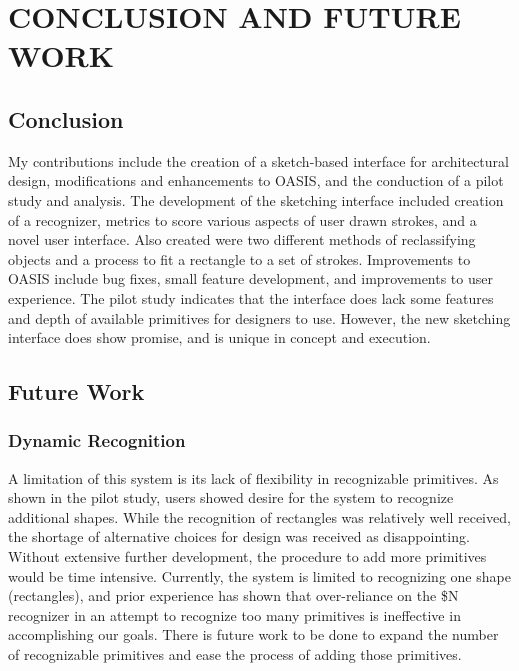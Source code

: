 \chapter{CONCLUSION AND FUTURE WORK} \label{sec:conclusion}

\section{Conclusion}

My contributions include the creation of a sketch-based interface for architectural design, modifications and enhancements to OASIS, and the conduction of a pilot study and analysis. The development of the sketching interface included creation of a recognizer, metrics to score various aspects of user drawn strokes, and a novel user interface. Also created were two different methods of reclassifying objects and  a process to fit a rectangle to a set of strokes. Improvements to OASIS include bug fixes, small feature development, and improvements to user experience. The pilot study indicates that the interface does lack some features and depth of available primitives for designers to use. However, the new sketching interface does show promise, and is unique in concept and execution.

\section{Future Work}
\subsection{Dynamic Recognition}

A limitation of this system is its lack of flexibility in recognizable primitives. As shown in the pilot study, users showed desire for the system to recognize additional shapes. While the recognition of rectangles was relatively well received, the shortage of alternative choices for design was received as disappointing. Without extensive further development, the procedure to add more primitives would be time intensive. Currently, the system is limited to recognizing one shape (rectangles), and prior experience has shown that over-reliance on the \$N recognizer in an attempt to recognize too many primitives is ineffective in accomplishing our goals. There is future work to be done to expand the number of recognizable primitives and ease the process of adding those primitives.\\

